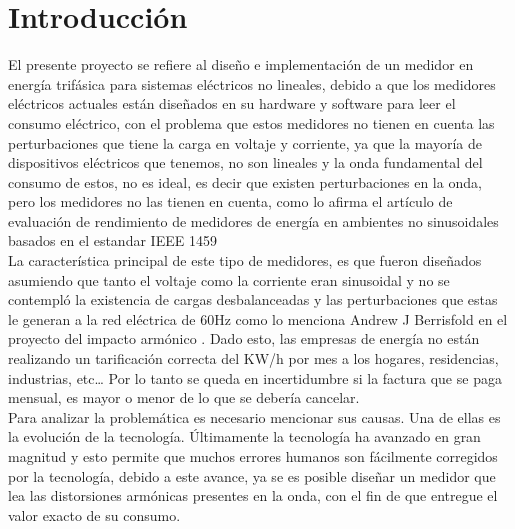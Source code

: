 

\newpage{\clearpage}
\chapter{ Introducción}

El presente proyecto se refiere al diseño e implementación de un medidor en energía trifásica para sistemas eléctricos no lineales, debido a que los medidores eléctricos actuales están diseñados en su hardware y software para leer el consumo eléctrico, con el problema que estos medidores no tienen en cuenta las perturbaciones que tiene la carga en voltaje y corriente, ya que la mayoría de dispositivos eléctricos que tenemos, no son lineales y la onda fundamental del consumo de estos, no es ideal, es decir que existen perturbaciones en la onda, pero los medidores no las tienen en cuenta, como lo afirma el artículo de evaluación de rendimiento de medidores de energía en ambientes no sinusoidales basados en el estandar IEEE 1459 \cite{A42} \\

La característica principal de este tipo de medidores, es que fueron diseñados asumiendo que tanto el voltaje como la corriente eran sinusoidal y no se contempló la existencia de cargas desbalanceadas y las perturbaciones que estas le generan a la red eléctrica de 60Hz como lo menciona Andrew J Berrisfold en el proyecto del impacto armónico \cite{A43}. Dado esto, las empresas de energía no están realizando un tarificación correcta del KW/h por mes a los hogares, residencias, industrias, etc… Por lo tanto se queda en incertidumbre si la factura que se paga mensual, es mayor o menor de lo que se debería cancelar.\\

Para analizar la problemática es necesario mencionar sus causas. Una de ellas es la evolución de la tecnología. Últimamente la tecnología ha avanzado en gran magnitud y esto permite que muchos errores humanos son fácilmente corregidos por la tecnología, debido a este avance, ya se es posible diseñar un medidor que lea las distorsiones armónicas presentes en la onda, con el fin de que entregue el valor exacto de su consumo.\\

